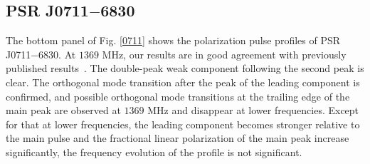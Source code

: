 \documentclass[useAMS,usenatbib]{mn2e}
\begin{document}

\subsection{PSR J0711$-$6830}

The bottom panel of Fig. \ref{0711} shows the polarization pulse profiles 
of PSR J0711$-$6830.
%
At $1369$ MHz, our results are in good agreement with previously published
results~\citep{Ord04,Yan11}. 
%
The double-peak weak component following the second peak is clear.
%
The orthogonal mode transition after the peak of the leading component 
is confirmed, and possible orthogonal mode transitions at the trailing edge 
of the main peak are observed at $1369$ MHz and disappear at lower frequencies.
%
Except for that at lower frequencies, the leading component becomes stronger  
relative to the main pulse and the fractional linear polarization of the 
main peak increase significantly, the frequency evolution of the profile 
is not significant.
\end{document}
